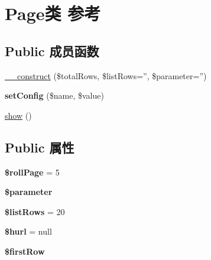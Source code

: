 \hypertarget{classPage}{\section{Page类 参考}
\label{classPage}
}
\subsection*{Public 成员函数}
\begin{DoxyCompactItemize}
\item 
\hyperlink{classPage_a9a6f8b5cb5f313558745090f2b5e7c95}{\+\_\+\+\_\+construct} (\$total\+Rows, \$list\+Rows='', \$parameter='')
\item 
\hypertarget{classPage_abf10385898e21077fb35b64176640d36}{{\bfseries set\+Config} (\$name, \$value)}\label{classPage_abf10385898e21077fb35b64176640d36}

\item 
\hyperlink{classPage_aa47251cbd2223e5f27a1f6d7336d3f4f}{show} ()
\end{DoxyCompactItemize}
\subsection*{Public 属性}
\begin{DoxyCompactItemize}
\item 
\hypertarget{classPage_a8f899147ea254d130a2fb7acd677c9e9}{{\bfseries \$roll\+Page} = 5}\label{classPage_a8f899147ea254d130a2fb7acd677c9e9}

\item 
\hypertarget{classPage_a428bbf909226102fe54a24deb89f2cf0}{{\bfseries \$parameter}}\label{classPage_a428bbf909226102fe54a24deb89f2cf0}

\item 
\hypertarget{classPage_abf2136c7bb0d3d6d25eb0af8adc9b33e}{{\bfseries \$list\+Rows} = 20}\label{classPage_abf2136c7bb0d3d6d25eb0af8adc9b33e}

\item 
\hypertarget{classPage_a5ab4769039cbf6a2254e9adf10323328}{{\bfseries \$hurl} = null}\label{classPage_a5ab4769039cbf6a2254e9adf10323328}

\item 
\hypertarget{classPage_a486f00bd2209c7b62ed610e10ef77750}{{\bfseries \$first\+Row}}\label{classPage_a486f00bd2209c7b62ed610e10ef77750}

\end{DoxyCompactItemize}
